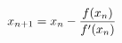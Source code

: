 \documentclass[preview]{standalone}
\begin{document}
\begin{align*}
\special{dvisvgm:raw <g id='unique000'>}x_{n+1}=x_n-\frac{f(x_n)}{f'(x_n)}\special{dvisvgm:raw </g>}
\end{align*}
\end{document}
